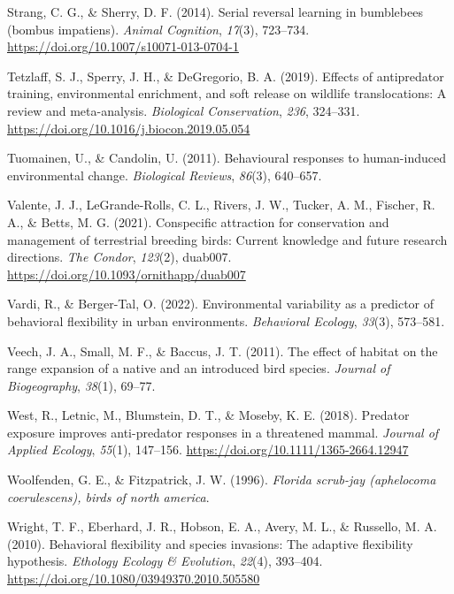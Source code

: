 \documentclass[
]{article}
\newlength{\cslhangindent}
\newenvironment{CSLReferences}[2] %
 {\begin{list}{}{%
  \setlength{\itemindent}{0pt}
  \setlength{\leftmargin}{0pt}
  \setlength{\parsep}{0pt}
  \ifodd #1
   \setlength{\leftmargin}{\cslhangindent}
   \setlength{\itemindent}{-1\cslhangindent}
  \fi
  \setlength{\itemsep}{#2\baselineskip}}}
 {\end{list}}
\begin{document}
\begin{CSLReferences}{1}{0}
Strang, C. G., \& Sherry, D. F. (2014). Serial reversal learning in
bumblebees (bombus impatiens). \emph{Animal Cognition}, \emph{17}(3),
723--734. \url{https://doi.org/10.1007/s10071-013-0704-1}

Tetzlaff, S. J., Sperry, J. H., \& DeGregorio, B. A. (2019). Effects of
antipredator training, environmental enrichment, and soft release on
wildlife translocations: A review and meta-analysis. \emph{Biological
Conservation}, \emph{236}, 324--331.
\url{https://doi.org/10.1016/j.biocon.2019.05.054}

Tuomainen, U., \& Candolin, U. (2011). Behavioural responses to
human-induced environmental change. \emph{Biological Reviews},
\emph{86}(3), 640--657.

Valente, J. J., LeGrande-Rolls, C. L., Rivers, J. W., Tucker, A. M.,
Fischer, R. A., \& Betts, M. G. (2021). Conspecific attraction for
conservation and management of terrestrial breeding birds: Current
knowledge and future research directions. \emph{The Condor},
\emph{123}(2), duab007. \url{https://doi.org/10.1093/ornithapp/duab007}

Vardi, R., \& Berger-Tal, O. (2022). Environmental variability as a
predictor of behavioral flexibility in urban environments.
\emph{Behavioral Ecology}, \emph{33}(3), 573--581.

Veech, J. A., Small, M. F., \& Baccus, J. T. (2011). The effect of
habitat on the range expansion of a native and an introduced bird
species. \emph{Journal of Biogeography}, \emph{38}(1), 69--77.

West, R., Letnic, M., Blumstein, D. T., \& Moseby, K. E. (2018).
Predator exposure improves anti-predator responses in a threatened
mammal. \emph{Journal of Applied Ecology}, \emph{55}(1), 147--156.
\url{https://doi.org/10.1111/1365-2664.12947}

Woolfenden, G. E., \& Fitzpatrick, J. W. (1996). \emph{Florida scrub-jay
(aphelocoma coerulescens), birds of north america}.

Wright, T. F., Eberhard, J. R., Hobson, E. A., Avery, M. L., \&
Russello, M. A. (2010). Behavioral flexibility and species invasions:
The adaptive flexibility hypothesis. \emph{Ethology Ecology \&
Evolution}, \emph{22}(4), 393--404.
\url{https://doi.org/10.1080/03949370.2010.505580}


\end{CSLReferences}
\end{document}
